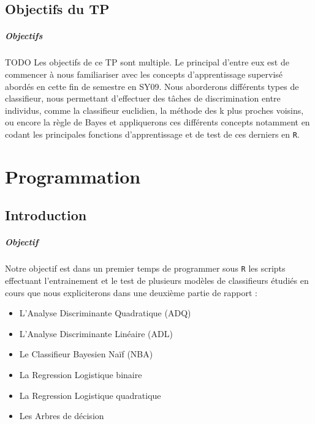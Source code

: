 \documentclass{report}
\begin{document}
\section{Objectifs du TP}
\paragraph{Objectifs}
TODO
Les objectifs de ce TP sont multiple. Le principal d'entre eux est de commencer à nous familiariser avec les concepts d'apprentissage supervisé abordés en cette fin de semestre en SY09. Nous aborderons différents types de classifieur, nous permettant d'effectuer des tâches de discrimination entre individus, comme la classifieur euclidien, la méthode des k plus proches voisins, ou encore la règle de Bayes et appliquerons ces différents concepts notamment en codant les principales fonctions d'apprentissage et de test de ces derniers en \verb+R+.

\chapter{Programmation}
\section{Introduction}
\paragraph{Objectif}
Notre objectif est dans un premier temps de programmer sous \verb+R+ les scripts effectuant l'entrainement et le test de plusieurs modèles de classifieurs étudiés en cours que nous expliciterons dans une deuxième partie de rapport :

\begin{itemize}
    \item L'Analyse Discriminante Quadratique (ADQ)
    \item L'Analyse Discriminante Linéaire (ADL)
    \item Le Classifieur Bayesien Naïf (NBA)
    \item La Regression Logistique binaire
    \item La Regression Logistique quadratique
    \item Les Arbres de décision
\end{itemize}
\end{document}
